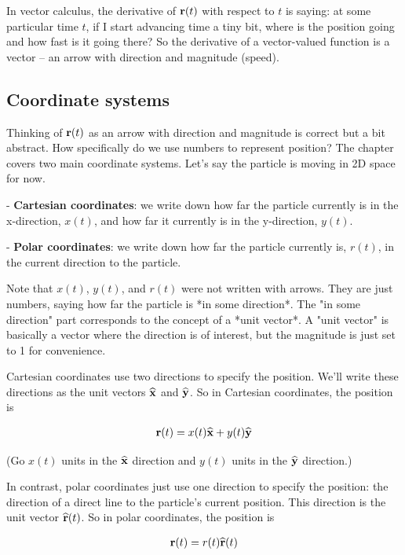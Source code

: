 In vector calculus, the derivative of $\mathbf{r}(t)$ with respect to $t$ is saying: at
some particular time $t$, if I start advancing time a tiny bit, where is the
position going and how fast is it going there? So the derivative of a
vector-valued function is a vector -- an arrow with direction and magnitude
(speed).


\subsection{Coordinate systems}

Thinking of $\mathbf{r}(t)$ as an arrow with direction and magnitude is correct but a
bit abstract. How specifically do we use numbers to represent position? The
chapter covers two main coordinate systems. Let's say the particle is moving in
2D space for now.

- \textbf{Cartesian coordinates}: we write down how far the particle currently is in
the x-direction, $x(t)$, and how far it currently is in the y-direction,
$y(t)$.

- \textbf{Polar coordinates}: we write down how far the particle currently is,
$r(t)$, in the current direction to the particle.

Note that $x(t)$, $y(t)$, and $r(t)$ were not written with arrows. They are
just numbers, saying how far the particle is *in some direction*. The "in some
direction" part corresponds to the concept of a *unit vector*. A "unit vector"
is basically a vector where the direction is of interest, but the magnitude is
just set to 1 for convenience.

Cartesian coordinates use two directions to specify the position. We'll write
these directions as the unit vectors $\mathbf{\widehat{x}}$ and $\mathbf{\widehat{y}}$. So in Cartesian
coordinates, the position is


\begin{align*}
  \mathbf{r}(t) = x(t)\mathbf{\widehat{x}} + y(t)\mathbf{\widehat{y}}
\end{align*}

(Go $x(t)$ units in the  $\mathbf{\widehat{x}}$ direction and $y(t)$ units in the $\mathbf{\widehat{y}}$ direction.)


In contrast, polar coordinates just use one direction to specify the position: the direction of a
direct line to the particle's current position. This direction is the unit vector $\mathbf{\widehat{r}}(t)$. So in
polar coordinates, the position is

\begin{align*}
\mathbf{r}(t) = r(t)\mathbf{\widehat{r}}(t)
\end{align*}

